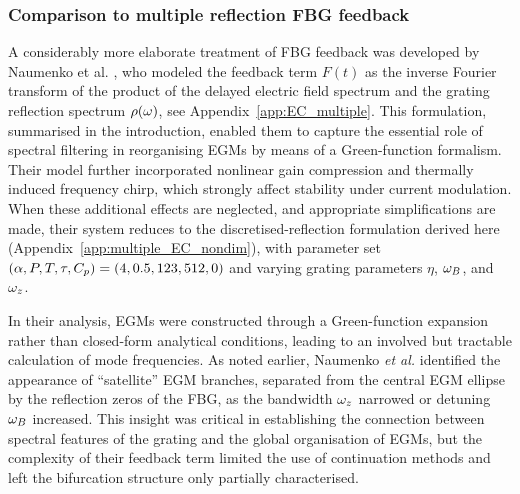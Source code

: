 \subsubsection{Comparison to multiple reflection FBG feedback}
\label{subsubsec:naumenko}
%
A considerably more elaborate treatment of FBG feedback was developed by Naumenko et al. \cite{naumenko2003characteristics,naumenko2004slow}, who modeled the feedback term $F(t)$ as the inverse Fourier transform of the product of the delayed electric field spectrum and the grating reflection spectrum $\rho(\omega)$, see Appendix~\ref{app:EC_multiple}.
This formulation, summarised in the introduction, enabled them to capture the essential role of spectral filtering in reorganising EGMs by means of a Green-function formalism. 
Their model further incorporated nonlinear gain compression and thermally induced frequency chirp, which strongly affect stability under current modulation.
When these additional effects are neglected, and appropriate simplifications are made, their system reduces to the discretised-reflection formulation derived here (Appendix~\ref{app:multiple_EC_nondim}), with parameter set $(\alpha, P, T, \tau, C_p) = (4, 0.5, 123, 512, 0)$ and varying grating parameters $\eta$, $\omega_B$, and $\omega_z$.
%
\par
%
In their analysis, EGMs were constructed through a Green-function expansion rather than closed-form analytical conditions, leading to an involved but tractable calculation of mode frequencies.
As noted earlier, Naumenko \textit{et al.} identified the appearance of “satellite” EGM branches, separated from the central EGM ellipse by the reflection zeros of the FBG, as the bandwidth $\omega_z$ narrowed or detuning $\omega_B$ increased.
This insight was critical in establishing the connection between spectral features of the grating and the global organisation of EGMs, but the complexity of their feedback term limited the use of continuation methods and left the bifurcation structure only partially characterised.
%
